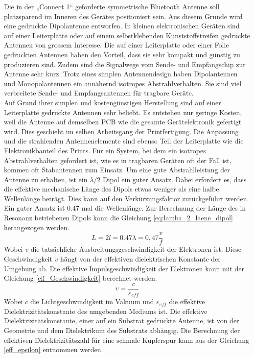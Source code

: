 Die in der „Connect  1“ geforderte symmetrische Bluetooth Antenne soll   platzsparend im Inneren des Gerätes positioniert sein. Aus diesem Grunde wird eine gedruckte Dipolantenne entworfen. In kleinen  elektronischen Geräten sind auf einer Leiterplatte oder auf einem selbstklebenden Kunststoffstreifen gedruckte Antennen  von grossem Interesse. Die auf einer Leiterplatte oder einer Folie gedruckten Antennen haben den Vorteil, dass sie sehr kompakt und günstig zu produzieren sind. Zudem sind die Signalwege vom Sende- und Empfangschip zur Antenne sehr kurz. Trotz eines simplen Antennendesign haben Dipolantennen und Monopolantennen ein annähernd isotropes Abstrahlverhalten. Sie sind viel verbreitete Sende- und Empfangsantennen für tragbare Geräte. \\

Auf Grund ihrer simplen und kostengünstigen  Herstellung sind auf  einer Leiterplatte gedruckte Antennen sehr beliebt. Es entstehen nur geringe Kosten, weil die Antenne auf demselben PCB wie die gesamte Gerätelektronik gefertigt wird. Dies geschieht im selben Arbeitsgang der Printfertigung. Die  Anpassung und die strahlenden  Antennenelemente sind ebenso Teil der Leiterplatte wie die Elektronikbauteil des Prints. Für ein System, bei dem ein isotropes Abstrahlverhalten gefordert ist, wie es in tragbaren Geräten oft der Fall ist, kommen oft Stabantennen zum Einsatz. 
Um eine gute Abstrahlleistung der Antenne zu erhalten, ist ein $\lambda /2$ Dipol ein guter Ansatz. Dabei erfordert es, dass die effektive mechanische Länge des Dipols etwas weniger als eine halbe Wellenlänge beträgt. Dies kann auf den Verkürzungsfaktor zurückgeführt werden. Ein guter Ansatz ist 0.47 mal die Wellenlänge. 
Zur Berechnung der Länge des in Resonanz betriebenen Dipols kann die  Gleichung \ref{eq:lamba_2_laene_dipol} herangezogen werden.
\begin{equation}\label{eq:lamba_2_laene_dipol}
L=2l = 0.47 \lambda= 0,47 \dfrac{v}{f}
\end{equation} 
Wobei $v$ die tatsächliche Ausbreitungsgeschwindigkeit der Elektronen ist. Diese Geschwindigkeit $v$ hängt von der effektiven dielektrischen Konstante der Umgebung  ab. 
Die effektive  Impulsgeschwindigkeit der Elektronen kann mit der Gleichung \ref{eff_Geschwindigkeit} berechnet werden. 
\begin{equation}\label{eff_Geschwindigkeit}
v = \dfrac{c}{\varepsilon_{eff}}
\end{equation}
Wobei $c$ die Lichtgeschwindigkeit im Vakuum und $\varepsilon_{eff}$  die effektive Dielektrizitätskonstante des umgebenden Mediums ist. Die effektive Dielektrizitätskonstante, einer auf ein Substrat gedruckte Antenne, ist von der  Geometrie und dem Dielektrikum des Substrats abhängig. Die Berechnung der effektiven Dielektrizitätszahl für eine schmale Kupferspur kann aus der Gleichung \ref{eff_epsilon} entnommen werden. 


